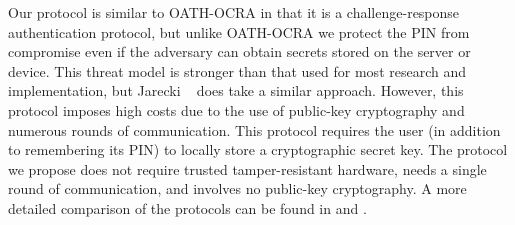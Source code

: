 Our protocol is similar to OATH-OCRA in that it is a challenge-response authentication protocol, but unlike OATH-OCRA we protect the PIN from compromise even if the adversary can obtain secrets stored on the server or device.
This threat model is stronger than that used for most research and implementation, but Jarecki \etal~\cite{JareckiJKSS21} does take a similar approach.
However, this protocol imposes high costs due to the use of public-key cryptography and numerous rounds of communication. 
This protocol requires the user (in addition to remembering its PIN) to locally store a cryptographic secret key. The protocol we propose does not require trusted tamper-resistant hardware, needs a single round of communication, and involves no public-key cryptography.
A more detailed comparison of the protocols can be found in  and .


